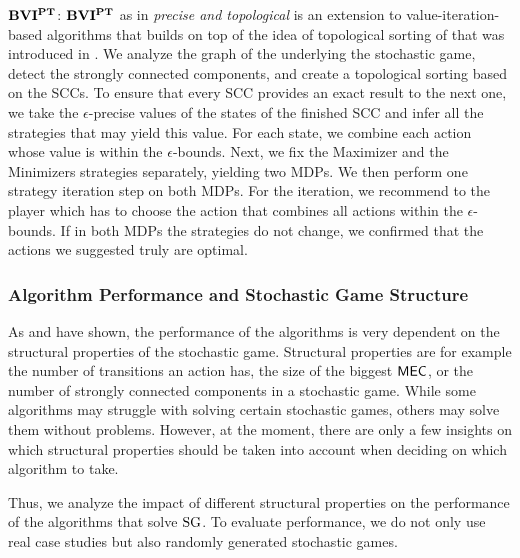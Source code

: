 $\mathbf{BVI^{PT}}$: $\mathbf{BVI^{PT}}$ as in \emph{precise and topological} is an extension to value-iteration-based algorithms that builds on top of the idea of topological sorting of \cite{gandalf} 
that was introduced in \cite{cav22}.
We analyze the graph of the underlying the stochastic game, detect the strongly connected components, and create a topological sorting based on the SCCs.
To ensure that every SCC provides an exact result to the next one, we take the $\epsilon$-precise values of the states of the finished SCC and infer all the
strategies that may yield this value.
For each state, we combine each action whose value is within the $\epsilon$-bounds.
Next, we fix the Maximizer and the Minimizers strategies separately, yielding two MDPs. We then perform one strategy iteration step on both MDPs.
For the iteration, we recommend to the player which has to choose the action that combines all actions within the $\epsilon$-bounds.
If in both MDPs the strategies do not change, we confirmed that the actions we suggested truly are optimal.


\subsubsection*{Algorithm Performance and Stochastic Game Structure}
As \cite{haddadmonmege} and \cite{gandalf} have shown, the performance of the algorithms is very dependent on the structural properties of the stochastic game.
Structural properties are for example the number of transitions an action has, the size of the biggest $\mathsf{MEC}$, or the number of strongly connected components in a stochastic game.
While some algorithms may struggle with solving certain stochastic games, others may solve them without problems.
However, at the moment, there are only a few insights on which structural properties should be taken into account when deciding on which algorithm to take.

Thus, we analyze the impact of different structural properties on the performance of the algorithms that solve $\textrm{SG}$.
To evaluate performance, we do not only use real case studies but also randomly generated stochastic games.